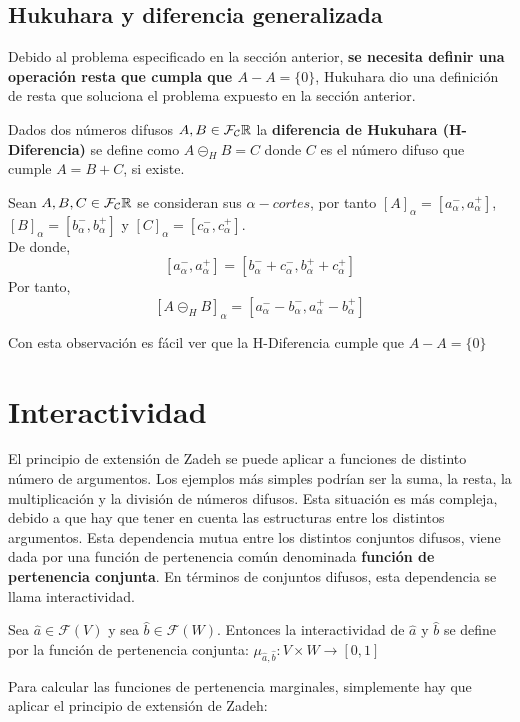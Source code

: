 \subsection{Hukuhara y diferencia generalizada} \label{def:hukukara}
Debido al problema especificado en la sección anterior, \textbf{se necesita definir una operación resta que cumpla que $A-A=\{0\}$}, Hukuhara dio una definición de resta que soluciona el problema expuesto en la sección anterior.

\begin{definicion}
	Dados dos números difusos $A, B \in \mathcal{F}_\mathcal{C}\mathbb R$ la \textbf{diferencia de Hukuhara (H-Diferencia)} se define como $A \circleddash_H B = C$ donde $C$ es el número difuso que cumple $A=B+C$, si existe.
\end{definicion}

\begin{observacion}
	Sean $A, B, C \in \mathcal{F}_\mathcal{C}\mathbb R$ se consideran sus $\alpha - cortes$, por tanto $[A]_\alpha = [a^-_\alpha, a^+_\alpha]$, $[B]_\alpha = [b^-_\alpha, b^+_\alpha]$ y $[C]_\alpha = [c^-_\alpha, c^+_\alpha]$. \\
	De donde,
	$$
	[a^-_\alpha, a^+_\alpha] = [b^-_\alpha + c^-_\alpha, b^+_\alpha + c^+_\alpha]
	$$
	Por tanto, 
	$$
	[A \circleddash_H B]_\alpha = [a_\alpha^- - b_\alpha^-, a_\alpha^+ - b_\alpha^+]
	$$
\end{observacion}
Con esta observación es fácil ver que la H-Diferencia cumple que $A-A=\{0\}$


\section{Interactividad}
El principio de extensión de Zadeh se puede aplicar a funciones de distinto número de argumentos. Los ejemplos más simples podrían ser la suma, la resta, la multiplicación y la división de números difusos. Esta situación es más compleja, debido a que hay que tener en cuenta las estructuras entre los distintos argumentos. Esta dependencia mutua entre los distintos conjuntos difusos, viene dada por una función de pertenencia común denominada \textbf{función de pertenencia conjunta}. En términos de conjuntos difusos, esta dependencia se llama interactividad.

\begin{definicion}
	Sea $\hat{a} \in \mathcal{F}(V)$ y sea $\hat{b} \in \mathcal{F}(W)$. Entonces la interactividad de $\hat{a}$ y $\hat{b}$ se define por la función de pertenencia conjunta: $\mu_{\hat{a}, \hat{b}} : V \times W \rightarrow [0, 1]$
\end{definicion}
Para calcular las funciones de pertenencia marginales, simplemente hay que aplicar el principio de extensión de Zadeh:

